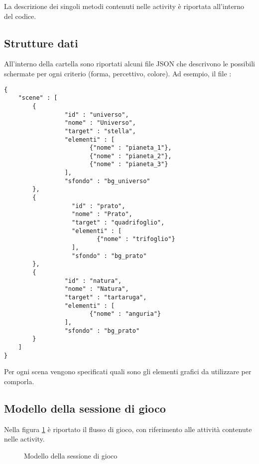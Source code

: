 La descrizione dei singoli metodi contenuti nelle activity è riportata all'interno del codice.

\subsection{Strutture dati}
All'interno della cartella  sono riportati alcuni file JSON che descrivono le possibili schermate per ogni criterio (forma, percettivo, colore). Ad esempio, il file :

\begin{lstlisting}[float, caption=Contenuto del file \code{percettivo.json}, label=lst:percettivo_json]
{
    "scene" : [
        {
                 "id" : "universo",
                 "nome" : "Universo",
                 "target" : "stella",
                 "elementi" : [
                        {"nome" : "pianeta_1"},
                        {"nome" : "pianeta_2"},
                        {"nome" : "pianeta_3"}
                 ],
                 "sfondo" : "bg_universo"
        },
        {
                   "id" : "prato",
                   "nome" : "Prato",
                   "target" : "quadrifoglio",
                   "elementi" : [
                          {"nome" : "trifoglio"}
                   ],
                   "sfondo" : "bg_prato"
        },
        {
                 "id" : "natura",
                 "nome" : "Natura",
                 "target" : "tartaruga",
                 "elementi" : [
                        {"nome" : "anguria"}
                 ],
                 "sfondo" : "bg_prato"
        }
    ]
}
\end{lstlisting}

Per ogni scena vengono specificati quali sono gli elementi grafici da utilizzare per comporla.

\subsection{Modello della sessione di gioco}
Nella figura \ref{fig:session} è riportato il flusso di gioco, con riferimento alle attività contenute nelle activity.

\begin{figure}[h!]
\caption{Modello della sessione di gioco}
\label{fig:session}
\end{figure}
